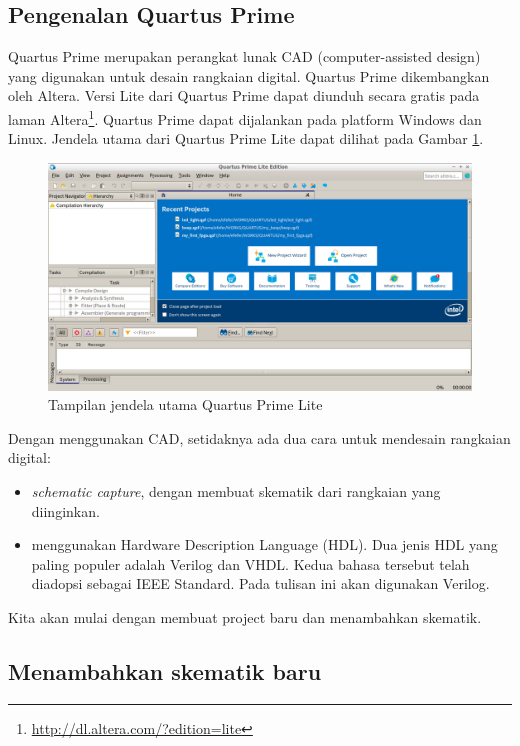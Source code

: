 \subsection{Pengenalan Quartus Prime}

Quartus Prime merupakan perangkat lunak CAD (computer-assisted design)
yang digunakan untuk desain rangkaian digital. Quartus Prime dikembangkan
oleh Altera. Versi Lite dari Quartus Prime dapat diunduh secara gratis
pada laman Altera\footnote{\url{http://dl.altera.com/?edition=lite}}.
Quartus Prime dapat dijalankan pada
platform Windows dan Linux.
Jendela utama dari Quartus Prime Lite dapat dilihat pada Gambar
\ref{fig:main_window}.

\begin{figure}
\centering
\includegraphics[width=\textwidth]{images/FirstOpen.png}
\par
\caption{Tampilan jendela utama Quartus Prime Lite}\label{fig:main_window}
\end{figure}

Dengan menggunakan CAD, setidaknya ada dua cara untuk
mendesain rangkaian digital:
\begin{itemize}
\item \textit{schematic capture}, dengan membuat skematik dari rangkaian yang
diinginkan.
\item menggunakan Hardware Description Language (HDL).
Dua jenis HDL yang paling populer adalah Verilog dan VHDL.
Kedua bahasa tersebut telah diadopsi sebagai IEEE Standard.
Pada tulisan ini akan digunakan Verilog.
\end{itemize}

Kita akan mulai dengan membuat project baru dan menambahkan skematik.



\subsection{Menambahkan skematik baru}\label{subsec:skematik}

